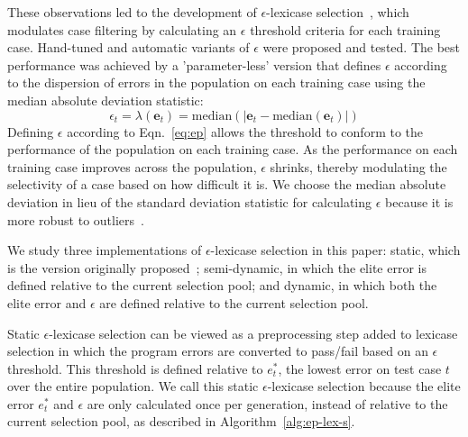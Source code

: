 \documentclass[twoside]{article}
\newcommand{\edit}[1]{{\color{red} #1}}
\begin{document}
These observations led to the development of $\epsilon$-lexicase selection~\citep{la_cava_epsilon-lexicase_2016}, \edit{which modulates case filtering by calculating an $\epsilon$ threshold criteria for each training case.} Hand-tuned and automatic variants of $\epsilon$ were proposed and tested. The best performance was achieved by a 'parameter-less' version that defines $\epsilon$ according to the dispersion of errors in the population on each training case using the median absolute deviation statistic:  
\begin{equation}\label{eq:ep}
\epsilon_t = \lambda(\mathbf{e}_t) = \text{median}(|\mathbf{e}_t - \text{median}(\mathbf{e}_t)|) 
\end{equation}
\edit{Defining $\epsilon$ according to Eqn.~\ref{eq:ep} allows the threshold to conform to the performance of the population on each training case. As the performance on each training case improves across the population, $\epsilon$ shrinks, thereby modulating the selectivity of a case based on how difficult it is.} We choose the median absolute deviation in lieu of the standard deviation statistic for calculating $\epsilon$ because it is more robust to outliers~\citep{pham-gia_mean_2001}. 

We study three implementations of $\epsilon$-lexicase selection in this paper: static, which is the version originally proposed~\citep{la_cava_epsilon-lexicase_2016}; semi-dynamic, in which the elite error is defined relative to the current selection pool; and dynamic, in which both the elite error and $\epsilon$ are defined relative to the current selection pool. 

Static $\epsilon$-lexicase selection can be viewed as a preprocessing step added to lexicase selection in which the program errors are converted to pass/fail based on an $\epsilon$ threshold. This threshold is defined relative to $e^*_t$, the lowest error on test case $t$ over the entire population. We call this static $\epsilon$-lexicase selection because the elite error $e^*_t$ and $\epsilon$ are only calculated once per generation, instead of relative to the current selection pool, as described in Algorithm~\ref{alg:ep-lex-s}.
\end{document}
